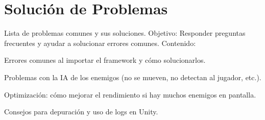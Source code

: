 \section{Solución de Problemas}
Lista de problemas comunes y sus soluciones.
Objetivo: Responder preguntas frecuentes y ayudar a solucionar errores comunes.
 Contenido:

Errores comunes al importar el framework y cómo solucionarlos.

Problemas con la IA de los enemigos (no se mueven, no detectan al jugador, etc.).

Optimización: cómo mejorar el rendimiento si hay muchos enemigos en pantalla.

Consejos para depuración y uso de logs en Unity.